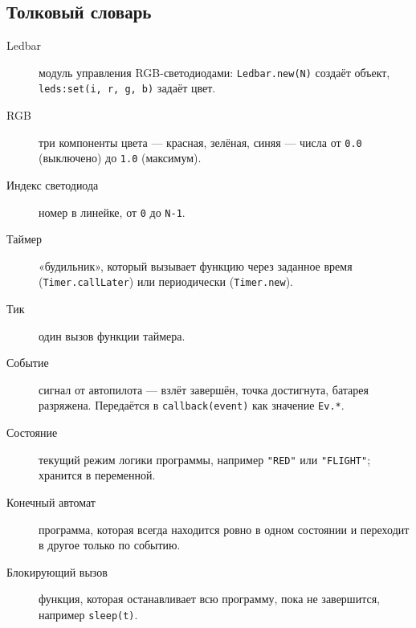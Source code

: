 \subsection{Толковый словарь}
\begin{description}
  \item[\hypertarget{term:ledbar}{Ledbar}] модуль управления RGB-светодиодами: \verb|Ledbar.new(N)| создаёт объект, \verb|leds:set(i, r, g, b)| задаёт цвет.
  \item[\hypertarget{term:rgb}{RGB}] три компоненты цвета --- красная, зелёная, синяя --- числа от \verb|0.0| (выключено) до \verb|1.0| (максимум).
  \item[\hypertarget{term:index}{Индекс светодиода}] номер в линейке, от \verb|0| до \verb|N-1|.
  \item[\hypertarget{term:timer}{Таймер}] «будильник», который вызывает функцию через заданное время (\verb|Timer.callLater|) или периодически (\verb|Timer.new|).
  \item[\hypertarget{term:tick}{Тик}] один вызов функции таймера.
  \item[\hypertarget{term:event}{Событие}] сигнал от автопилота --- взлёт завершён, точка достигнута, батарея разряжена. Передаётся в \verb|callback(event)| как значение \verb|Ev.*|.
  \item[\hypertarget{term:state}{Состояние}] текущий режим логики программы, например \verb|"RED"| или \verb|"FLIGHT"|; хранится в переменной.
  \item[\hypertarget{term:automaton}{Конечный автомат}] программа, которая всегда находится ровно в одном состоянии и переходит в другое только по событию.
  \item[\hypertarget{term:blocking}{Блокирующий вызов}] функция, которая останавливает всю программу, пока не завершится, например \verb|sleep(t)|.
\end{description}
